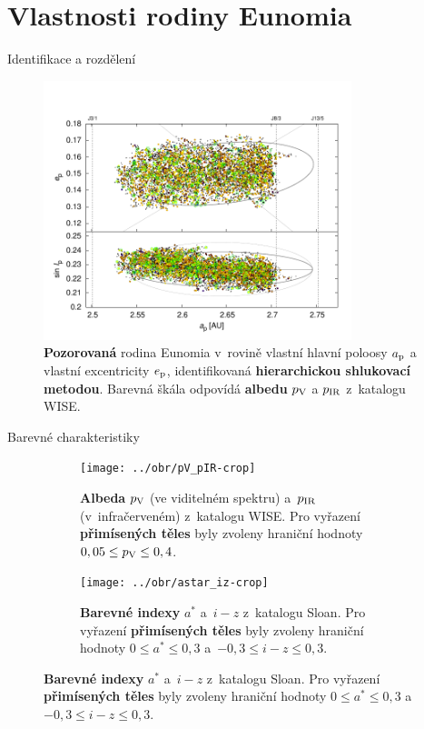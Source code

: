 \documentclass[xcolor=dvipsnames]{beamer}
\begin{document}
\section{Vlastnosti rodiny Eunomia}


\begin{frame}[t]{\secname}{Identifikace a rozdělení}
	\vspace{-1cm}
	\begin{figure}
		\centering
		\includegraphics[width=0.8\textwidth]{../obr/ae_ai_wise}
		\vspace{-0.3cm}
		\caption{\footnotesize{\textbf{Pozorovaná} rodina Eunomia v~rovině vlastní hlavní poloosy $a_{\rm p}$ a vlastní excentricity $e_{\rm p}$, identifikovaná \textbf{hierarchickou shlukovací metodou}. Barevná škála odpovídá \textbf{albedu} $p_{\rm V}$ a $p_{\rm IR}$ z~katalogu WISE\@.}}
	\end{figure}
\end{frame}

\begin{frame}[t]{\secname}{Barevné charakteristiky}
	\begin{figure}
	\captionsetup[subfigure]{justification=centering}
		\begin{subfigure}[c]{0.49\textwidth}
			\centering
			\texttt{[image: ../obr/pV\_pIR-crop]}
			\caption{\textbf{Albeda} $p_{\rm V}$ (ve viditelném spektru) a~$p_{\rm IR}$ (v~infračerveném) z~katalogu WISE. Pro vyřazení \textbf{přimísených těles} byly zvoleny hraniční hodnoty $0,05 \leq p_{\rm V} \leq 0,4$.}
		\end{subfigure}
		\begin{subfigure}[c]{0.49\textwidth}
			\centering
			\texttt{[image: ../obr/astar\_iz-crop]}
			\caption{\textbf{Barevné indexy} $a^*$ a~$i-z$ z~katalogu Sloan. Pro vyřazení \textbf{přimísených těles} byly zvoleny hraniční hodnoty $0\leq a^* \leq 0,3$ a~$-0,3\leq i-z \leq 0,3$.}
		\end{subfigure}

	\end{figure}
\end{frame}
\end{document}
